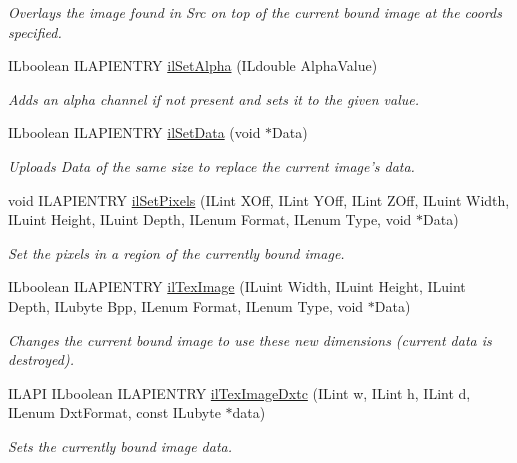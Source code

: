 \begin{DoxyCompactItemize}
\begin{DoxyCompactList}\small\item\em Overlays the image found in Src on top of the current bound image at the coords specified. \end{DoxyCompactList}\item 
I\-Lboolean I\-L\-A\-P\-I\-E\-N\-T\-R\-Y \hyperlink{group__image__manip_ga8887f494b3ed8dc889e783d5e3e3865f}{il\-Set\-Alpha} (I\-Ldouble Alpha\-Value)
\begin{DoxyCompactList}\small\item\em Adds an alpha channel if not present and sets it to the given value. \end{DoxyCompactList}\item 
I\-Lboolean I\-L\-A\-P\-I\-E\-N\-T\-R\-Y \hyperlink{group__image__manip_ga0f4d316f0aa3420fae6817cd8b8c6a7c}{il\-Set\-Data} (void $\ast$Data)
\begin{DoxyCompactList}\small\item\em Uploads Data of the same size to replace the current image's data. \end{DoxyCompactList}\item 
\hypertarget{group__image__manip_gacbb2f4de541d3ea64b2ef079bb78e724}{void I\-L\-A\-P\-I\-E\-N\-T\-R\-Y \hyperlink{group__image__manip_gacbb2f4de541d3ea64b2ef079bb78e724}{il\-Set\-Pixels} (I\-Lint X\-Off, I\-Lint Y\-Off, I\-Lint Z\-Off, I\-Luint Width, I\-Luint Height, I\-Luint Depth, I\-Lenum Format, I\-Lenum Type, void $\ast$Data)}\label{group__image__manip_gacbb2f4de541d3ea64b2ef079bb78e724}

\begin{DoxyCompactList}\small\item\em Set the pixels in a region of the currently bound image. \end{DoxyCompactList}\item 
I\-Lboolean I\-L\-A\-P\-I\-E\-N\-T\-R\-Y \hyperlink{group__image__manip_ga4a0b02cccd4ccb9c863235fbfdb646eb}{il\-Tex\-Image} (I\-Luint Width, I\-Luint Height, I\-Luint Depth, I\-Lubyte Bpp, I\-Lenum Format, I\-Lenum Type, void $\ast$Data)
\begin{DoxyCompactList}\small\item\em Changes the current bound image to use these new dimensions (current data is destroyed). \end{DoxyCompactList}\item 
I\-L\-A\-P\-I I\-Lboolean I\-L\-A\-P\-I\-E\-N\-T\-R\-Y \hyperlink{group__image__manip_ga7be29284583785797fbda3b49a939975}{il\-Tex\-Image\-Dxtc} (I\-Lint w, I\-Lint h, I\-Lint d, I\-Lenum Dxt\-Format, const I\-Lubyte $\ast$data)
\begin{DoxyCompactList}\small\item\em Sets the currently bound image data. \end{DoxyCompactList}\end{DoxyCompactItemize}


